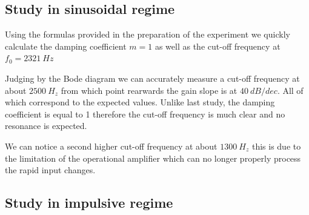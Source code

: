 \documentclass[11pt, openright]{book}
\begin{document}
\subsection{Study in sinusoidal regime}


\begin{figure}
  \centering
\end{figure}

Using the formulas provided in the preparation of the experiment we quickly calculate the damping coefficient $m=1$ as well as the cut-off frequency at $f_0=2321\ Hz$

Judging by the Bode diagram we can accurately measure a cut-off frequency at about $2500\ H_z$ from which point rearwards the gain slope is at $40\ dB/dec$. All of which correspond to the expected values. Unlike last study, the damping coefficient is equal to 1 therefore the cut-off frequency is much clear and no resonance is expected. 

We can notice a second higher cut-off frequency at about $1300\ H_z$ this is due to the limitation of the operational amplifier which can no longer properly process the rapid input changes. 

\subsection{Study in impulsive regime}
\end{document}
